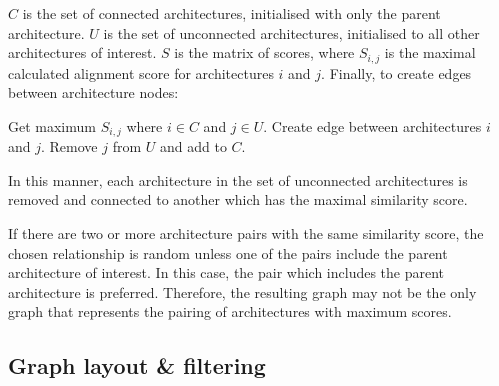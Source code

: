 $C$ is the set of connected architectures, initialised with only the parent architecture. $U$ is the set of unconnected architectures, initialised to all other architectures of interest. $S$ is the matrix of scores, where $S_{i,j}$ is the maximal calculated alignment score for architectures $i$ and $j$. Finally, to create edges between architecture nodes:
\begin{algorithmic}
\STATE Get maximum $S_{i,j}$ where $i \in C$ and $j \in U$.
\STATE Create edge between architectures $i$ and $j$.
\STATE Remove $j$ from $U$ and add to $C$.
\ENDWHILE
\end{algorithmic}
In this manner, each architecture in the set of unconnected architectures is removed and connected to another which has the maximal similarity score.

If there are two or more architecture pairs with the same similarity score, the chosen relationship is random unless one of the pairs include the parent architecture of interest. In this case, the pair which includes the parent architecture is preferred. Therefore, the resulting graph may not be the only graph that represents the pairing of architectures with maximum scores. 

\subsection{Graph layout \& filtering}






